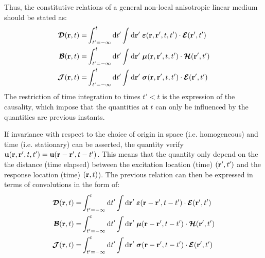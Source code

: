 Thus, the constitutive relations of a general non-local anisotropic linear medium should be stated as:
\begin{subequations}
	\begin{align}
	\boldsymbol{\mathcal{D}}(\mathbf{r}, t) 
	= &
	\int_{t'=-\infty}^t \mathop{}\!\mathrm{d} t'
	\int \mathop{}\!\mathrm{d} \mathbf{r}' \;
	\boldsymbol{\varepsilon}(\mathbf{r},\mathbf{r}', t,t') \cdot \boldsymbol{\mathcal{E}}(\mathbf{r}', t') 
	\\
	\boldsymbol{\mathcal{B}}(\mathbf{r}, t)
	=& 
	\int_{t'=-\infty}^t \mathop{}\!\mathrm{d} t'
	\int \mathop{}\!\mathrm{d} \mathbf{r}' \;
	\boldsymbol{\mu}(\mathbf{r},\mathbf{r}', t,t') \cdot \boldsymbol{\mathcal{H}}(\mathbf{r}', t')  
	\\
	\boldsymbol{\mathcal{J}}(\mathbf{r}, t)
	=& 
	\int_{t'=-\infty}^t \mathop{}\!\mathrm{d} t'
	\int \mathop{}\!\mathrm{d} \mathbf{r}' \;
	\boldsymbol{\sigma}(\mathbf{r},\mathbf{r}', t,t') \cdot \boldsymbol{\mathcal{E}}(\mathbf{r}', t')  
	\end{align}
\end{subequations}
The restriction of time integration to times $t'<t$ is the expression of the causality, which impose that the quantities at $t$ can only be influenced by the quantities are previous instants.

If invariance with respect to the choice of origin in space (i.e. homogeneous) and time (i.e. stationary) can be asserted, the quantity verify $\mathbf{u}(\mathbf{r},\mathbf{r}',t,t')=\mathbf{u}(\mathbf{r}-\mathbf{r}', t-t')$. This means that the quantity only depend on the the distance (time elapsed) between the excitation location (time) $(\mathbf{r}', t')$ and the response location (time) $(\mathbf{r},t)$)\parencite{Dumont2017}. The previous relation can then be expressed in terms of convolutions in the form of\parencite[p.19]{Brambilla1998}:
\begin{subequations}
	\begin{align}
	\boldsymbol{\mathcal{D}}(\mathbf{r}, t) 
	= &
	\int_{t'=-\infty}^t \mathop{}\!\mathrm{d} t'
	\int \mathop{}\!\mathrm{d} \mathbf{r}' \;
	\boldsymbol{\varepsilon}(\mathbf{r}-\mathbf{r}', t-t') \cdot \boldsymbol{\mathcal{E}}(\mathbf{r}', t') 
	\\
	\boldsymbol{\mathcal{B}}(\mathbf{r}, t)
	=& 
	\int_{t'=-\infty}^t \mathop{}\!\mathrm{d} t'
	\int \mathop{}\!\mathrm{d} \mathbf{r}' \;
	\boldsymbol{\mu}(\mathbf{r}-\mathbf{r}', t-t') \cdot \boldsymbol{\mathcal{H}}(\mathbf{r}', t')  
	\\
	\boldsymbol{\mathcal{J}}(\mathbf{r}, t)
	=& 
	\int_{t'=-\infty}^t \mathop{}\!\mathrm{d} t'
	\int \mathop{}\!\mathrm{d} \mathbf{r}' \;
	\boldsymbol{\sigma}(\mathbf{r}-\mathbf{r}', t-t') \cdot \boldsymbol{\mathcal{E}}(\mathbf{r}', t')  
	\end{align}
	\label{eq:disp_relation_stationnary}
\end{subequations}


